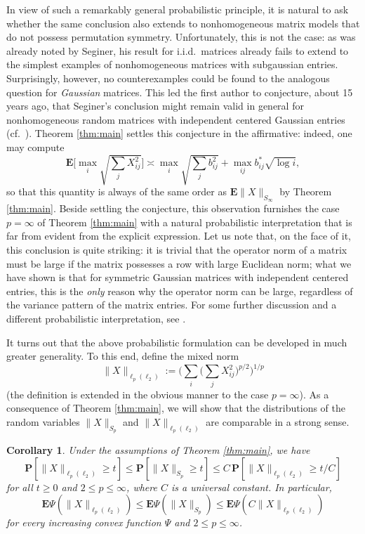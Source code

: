 \documentclass[10pt,reqno]{amsart}
\newtheorem{cor}[thm]{Corollary}
\theoremstyle{definition}
\numberwithin{equation}{section}
\numberwithin{figure}{section}
\numberwithin{table}{section}
\begin{document}
In view of such a remarkably general probabilistic principle, it is 
natural to ask whether the same conclusion also extends to nonhomogeneous 
matrix models that do not possess permutation symmetry. Unfortunately, 
this is not the case: as was already noted by Seginer, his result for 
i.i.d.\ matrices already fails to extend to the simplest examples of 
nonhomogeneous matrices with subgaussian entries. Surprisingly, however, 
no counterexamples could be found to the analogous question for 
\emph{Gaussian} matrices. This led the first author to conjecture, about 
15 years ago, that Seginer's conclusion might remain valid in 
general for nonhomogeneous random matrices with independent centered 
Gaussian entries (cf.\ \cite{Lat05}). Theorem \ref{thm:main} settles 
this conjecture in the affirmative: indeed, one may compute \cite[Theorem 
1.2]{vH17}
$$
	\mathbf{E}\Bigg[
	\max_i\sqrt{\sum_j X_{ij}^2}
	\Bigg] \asymp
	\max_i\sqrt{\sum_j b_{ij}^2} +
	\max_{ij} b_{ij}^*\sqrt{\log i},
$$
so that this quantity is always of the same order as 
$\mathbf{E}\|X\|_{S_\infty}$ by Theorem \ref{thm:main}. Beside settling 
the conjecture, this observation furnishes the case $p=\infty$ of Theorem 
\ref{thm:main} with a natural probabilistic interpretation that is far 
from evident from the explicit expression. Let us note that, on the face 
of it, this conclusion is quite striking: it is trivial that the 
operator norm of a matrix must be large if the matrix possesses a row with 
large Euclidean norm; what we have shown is that for symmetric Gaussian 
matrices with independent centered entries, this is the \emph{only} reason 
why the operator norm can be large, regardless of the variance pattern of 
the matrix entries. For some further discussion and a different 
probabilistic interpretation, see \cite{vH17}.

It turns out that the above probabilistic formulation can be developed 
in much greater generality. To this end, define the mixed norm
$$
	\|X\|_{\ell_p(\ell_2)} :=
	\Bigg(\sum_i\Bigg(\sum_j X_{ij}^2
	\Bigg)^{p/2}\Bigg)^{1/p}
$$
(the definition is extended in the obvious manner to the case $p=\infty$).
As a consequence of Theorem \ref{thm:main}, we will show that the
distributions of the random variables $\|X\|_{S_p}$ and
$\|X\|_{\ell_p(\ell_2)}$ are comparable in a strong sense.

\begin{cor}
\label{cor:schattentail}
Under the assumptions of Theorem \ref{thm:main}, we have
$$
	\mathbf{P}[\|X\|_{\ell_p(\ell_2)}\ge t] \le
	\mathbf{P}[\|X\|_{S_p}\ge t] \le
	C\,\mathbf{P}[\|X\|_{\ell_p(\ell_2)}\ge t/C]
$$
for all $t\ge 0$ and $2\le p\le\infty$, where $C$ is a universal constant.
In particular,
$$
	\mathbf{E}\Psi(\|X\|_{\ell_p(\ell_2)}) \le
	\mathbf{E}\Psi(\|X\|_{S_p}) \le
	\mathbf{E}\Psi(C\|X\|_{\ell_p(\ell_2)})
$$
for every increasing convex function $\Psi$ and $2\le p\le\infty$.
\end{cor}
\end{document}
